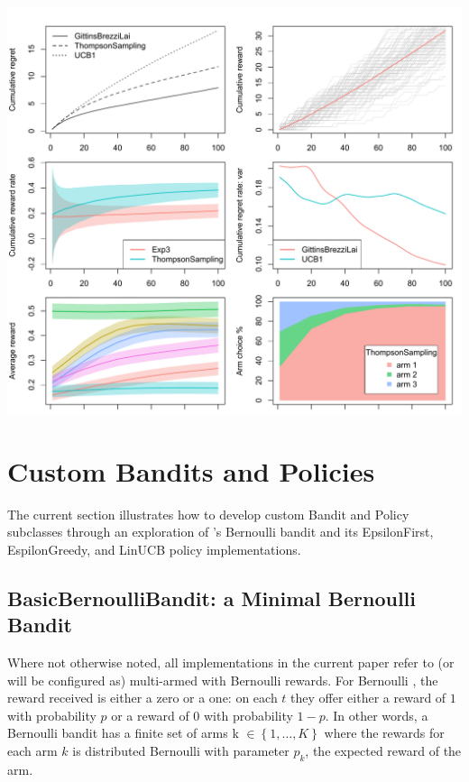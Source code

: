 \documentclass{jss}
\begin{document}
\includegraphics[width=\textwidth]{fig/section_4_2_plot}

\section{Custom Bandits and Policies} \label{extending}

The current section illustrates how to develop custom Bandit and Policy subclasses through an exploration of 's Bernoulli bandit and its EpsilonFirst, EspilonGreedy, and LinUCB policy implementations.

\subsection{BasicBernoulliBandit: a Minimal Bernoulli Bandit} \label{BasicBernoulliBandit}

Where not otherwise noted, all  implementations in the current paper refer to (or will be configured as) multi-armed  with Bernoulli rewards. For Bernoulli , the reward received is either a zero or a one: on each $t$ they offer either a reward of $1$ with probability $p$ or a reward of $0$ with probability $1 - p$. In other words, a Bernoulli bandit has a finite set of arms k \(  \in \left\{ 1, \dots, K \right\} \) where the rewards for each arm $k$ is distributed Bernoulli with parameter $p_k$, the expected reward of the arm.
\end{document}
